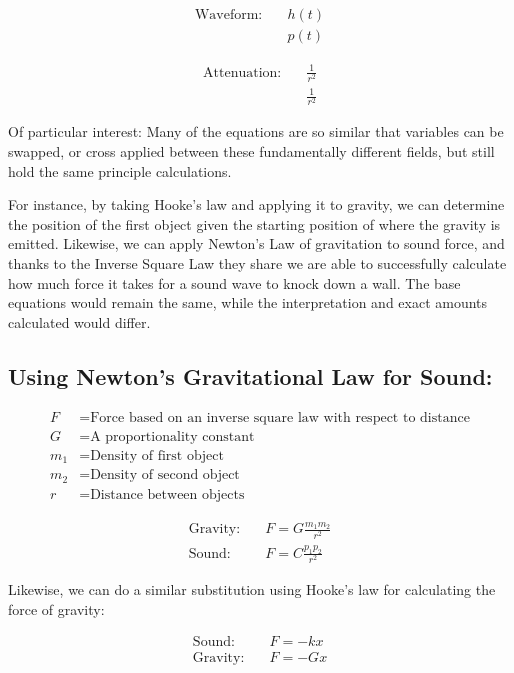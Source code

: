 \documentclass[12pt]{article}
\begin{document}
\begin{align*}
\text{Waveform:} \quad & h(t) \\
& p(t)
\end{align*}

\begin{align*}
\text{Attenuation:} \quad & \frac{1}{r^{2}} \\
& \frac{1}{r^{2}}
\end{align*}

Of particular interest: Many of the equations are so similar that variables can be swapped, or cross applied between these fundamentally different fields, but still hold the same principle calculations.

For instance, by taking Hooke's law and applying it to gravity, we can determine the position of the first object given the starting position of where the gravity is emitted. Likewise, we can apply Newton’s Law of gravitation to sound force, and thanks to the Inverse Square Law they share we are able to successfully calculate how much force it takes for a sound wave to knock down a wall. The base equations would remain the same, while the interpretation and exact amounts calculated would differ.

\subsection*{Using Newton’s Gravitational Law for Sound:}

\begin{align*}
F &= \text{Force based on an inverse square law with respect to distance} \\
G &= \text{A proportionality constant} \\
m_1 &= \text{Density of first object} \\
m_2 &= \text{Density of second object} \\
r &= \text{Distance between objects}
\end{align*}

\begin{align*}
\text{Gravity:} \quad & F = G \frac{m_1 m_2}{r^2} \\
\text{Sound:} \quad & F = C \frac{p_1 p_2}{r^2}
\end{align*}

Likewise, we can do a similar substitution using Hooke's law for calculating the force of gravity:

\begin{align*}
\text{Sound:} \quad & F = -k x \\
\text{Gravity:} \quad & F = -G x
\end{align*}
\end{document}
